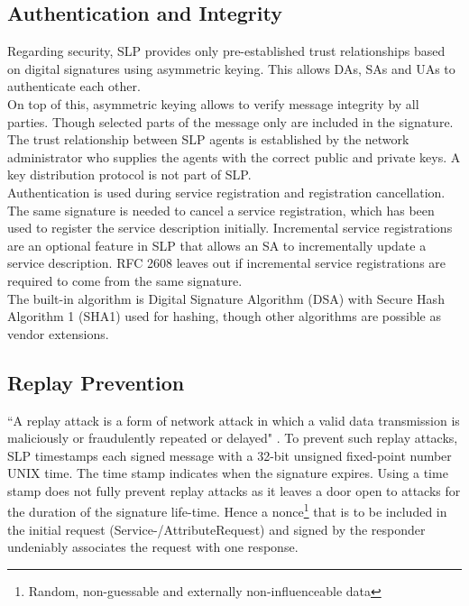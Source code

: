 \subsection{Authentication and Integrity\label{sub:Authentication-and-Integrity}}
Regarding security, SLP provides only pre-established trust relationships based on digital signatures using asymmetric keying. This allows DAs, SAs and UAs to authenticate each other.\\
On top of this, asymmetric keying allows to verify message integrity by all parties. Though selected parts of the message only are included in the signature.\\
The trust relationship between SLP agents is established by the network administrator who supplies the agents with the correct public and private keys. A key distribution protocol is not part of SLP.\\
Authentication is used during service registration and registration cancellation. The same signature is needed to cancel a service registration, which has been used to register the service description initially. Incremental service registrations are an optional feature in SLP that allows an SA to incrementally update a service description. RFC 2608 leaves out if incremental service registrations are required to come from the same signature.\\
The built-in algorithm is Digital Signature Algorithm (DSA) \citep{Kravitz1993} with Secure Hash Algorithm 1 (SHA1) \citep{Eastlake3rd2001} used for hashing, though other algorithms are possible as vendor extensions.

\subsection{Replay Prevention\label{sub:Replay-Prevention}}
``A replay attack is a form of network attack in which a valid data transmission
is maliciously or fraudulently repeated or delayed" \citep{Wikipedia2009}. To
prevent such replay attacks, SLP timestamps each signed message with a 32-bit
unsigned fixed-point number UNIX time. The time stamp indicates when the
signature expires. Using a time stamp does not fully prevent replay attacks as it leaves
a door open to attacks for the duration of the signature life-time. Hence a
nonce\footnote{Random, non-guessable and externally non-influenceable data} that
is to be included in the initial request (Service-/AttributeRequest) and signed
by the responder undeniably associates the request with one response.

